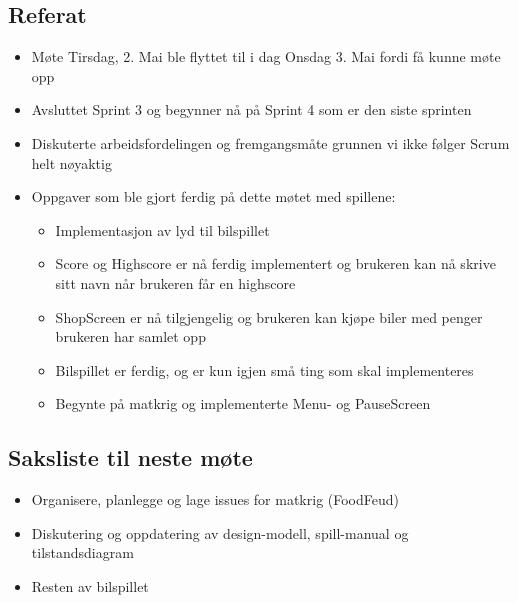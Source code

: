 \documentclass[11pt]{meetingmins}
\begin{document}
\maketitle
\subsection{Referat}
\begin{itemize}
	\item M{\o}te Tirsdag, 2. Mai ble flyttet til i dag Onsdag 3. Mai fordi få kunne møte opp
	\item Avsluttet Sprint 3 og begynner nå på Sprint 4 som er den siste sprinten
	\item Diskuterte arbeidsfordelingen og fremgangsmåte grunnen vi ikke følger Scrum helt nøyaktig
	\item Oppgaver som ble gjort ferdig på dette møtet med spillene:
	\begin{itemize}
		\item Implementasjon av lyd til bilspillet 
		\item Score og Highscore er nå ferdig implementert og brukeren kan nå skrive sitt navn når brukeren får en highscore
		\item ShopScreen er nå tilgjengelig og brukeren kan kjøpe biler med penger brukeren har samlet opp 
		\item Bilspillet er ferdig, og er kun igjen små ting som skal implementeres
		\item Begynte på matkrig og implementerte Menu- og PauseScreen  
	\end{itemize}
\end{itemize}

\subsection{Saksliste til neste møte}
\begin{itemize} 
		\item Organisere, planlegge og lage issues for matkrig (FoodFeud)  
		\item Diskutering og oppdatering av design-modell, spill-manual og tilstandsdiagram
		\item Resten av bilspillet
\end{itemize}
\end{document}

